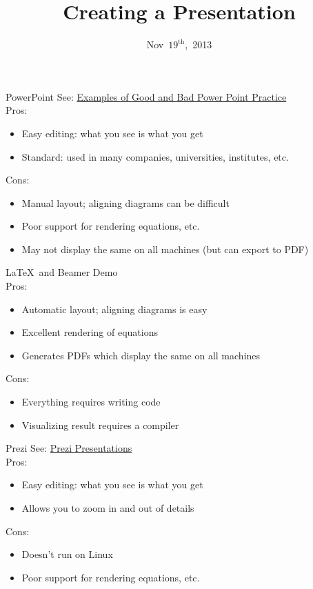 \documentclass{beamer}
\title{Creating a Presentation}
\date{Nov~$19^{\text{th}}$,~2013}
\begin{document}
\begin{frame}
\titlepage
\end{frame}

\begin{frame}{PowerPoint}
See: \href{http://www.feg-consulting.com/resource/practitioners-guide-to-hea/annexes-practitioners-guide/chapter-5/annex-d/}{Examples of Good and Bad Power Point Practice}\\
\bigskip
Pros:
\begin{itemize}
\item Easy editing: what you see is what you get
\item Standard: used in many companies, universities, institutes, etc.
\end{itemize}
Cons:
\begin{itemize}
\item Manual layout; aligning diagrams can be difficult
\item Poor support for rendering equations, etc.
\item May not display the same on all machines (but can export to PDF)
\end{itemize}
\end{frame}

\begin{frame}{\LaTeX\ and Beamer}
Demo\\
\bigskip
Pros:
\begin{itemize}
\item Automatic layout; aligning diagrams is easy
\item Excellent rendering of equations
\item Generates PDFs which display the same on all machines
\end{itemize}
Cons:
\begin{itemize}
\item Everything requires writing code
\item Visualizing result requires a compiler
\end{itemize}
\end{frame}

\begin{frame}{Prezi}
See: \href{http://prezi.com/c9pdlrpx3pr6/copy-of-presentation-on-presentations/}{Prezi Presentations}\\
\bigskip
Pros:
\begin{itemize}
\item Easy editing: what you see is what you get
\item Allows you to zoom in and out of details
\end{itemize}
Cons:
\begin{itemize}
\item Doesn't run on Linux
\item Poor support for rendering equations, etc.
\end{itemize}
\end{frame}
\end{document}
